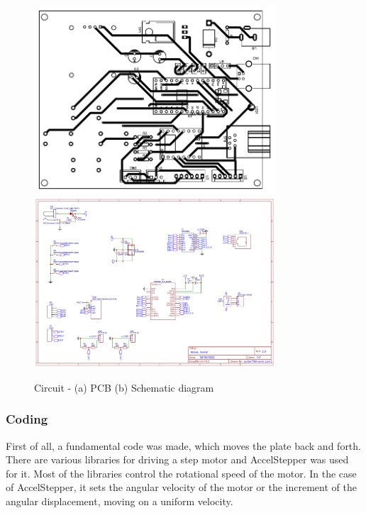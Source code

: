 \begin{figure}[H]
    \begin{center}
        \includegraphics[width=9cm, angle=90]{images/Circuit(PCB).pdf}
        \includegraphics[width=9cm, angle=90]{images/Circuit(Schematic).pdf}
    \end{center}
        \caption{Circuit - (a) PCB (b) Schematic diagram}
        \label{Circuit - PCB, Schematic}
\end{figure}

\subsubsection{Coding}
First of all, a fundamental code was made, which moves the plate back and forth. There are various libraries for driving a step motor and AccelStepper was used for it. Most of the libraries control the rotational speed of the motor. In the case of AccelStepper, it sets the angular velocity of the motor or the increment of the angular displacement, moving on a uniform velocity. 

